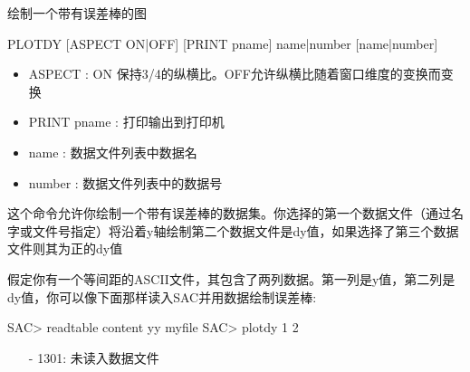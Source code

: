 \label{cmd:plotdy}

绘制一个带有误差棒的图

\begin{SACSTX}
PLOTDY [ASPECT ON|OFF] [PRINT pname] name|number [name|number]
\end{SACSTX}

\begin{itemize}
\item ASPECT  : ON 保持3/4的纵横比。OFF允许纵横比随着窗口维度的变换而变换 
\item PRINT {pname} : 打印输出到打印机 
\item name : 数据文件列表中数据名 
\item number : 数据文件列表中的数据号 
\end{itemize}

这个命令允许你绘制一个带有误差棒的数据集。你选择的第一个数据文件（通过名字或文件号指定）将沿着y轴绘制第二个数据文件是dy值，如果选择了第三个数据文件则其为正的dy值

假定你有一个等间距的ASCII文件，其包含了两列数据。第一列是y值，第二列是dy值，你可以像下面那样读入SAC并用数据绘制误差棒:
\begin{SACCode}
SAC> readtable content yy myfile
SAC> plotdy 1 2
\end{SACCode}

\begin{itemize}
\item[-]1301: 未读入数据文件
\end{itemize}
